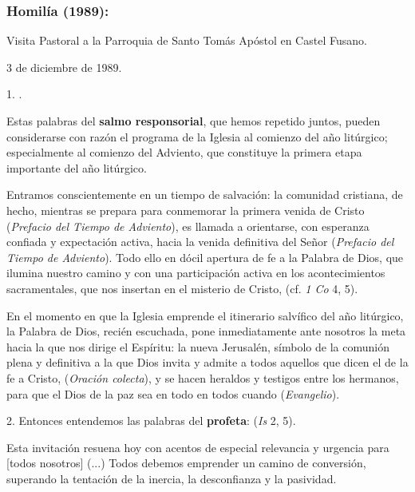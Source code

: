 \subsubsection{Homilía (1989): } Visita Pastoral a la Parroquia de Santo Tomás Apóstol en Castel Fusano.

3 de diciembre de 1989.

\begin{body}
	1. .
	
	Estas palabras del \textbf{salmo responsorial}, que hemos repetido juntos, pueden considerarse con razón el programa de la Iglesia al comienzo del año litúrgico; especialmente al comienzo del Adviento, que constituye la primera etapa importante del año litúrgico.
	
	Entramos conscientemente en un tiempo  de salvación: la comunidad cristiana, de hecho, mientras se prepara para conmemorar la primera venida de Cristo  (\emph{Prefacio del Tiempo de Adviento}), es llamada a orientarse, con esperanza confiada y expectación activa, hacia la venida definitiva del Señor  (\emph{Prefacio del Tiempo de Adviento}). Todo ello en dócil apertura de fe a la Palabra de Dios, que ilumina nuestro camino y con una participación activa en los acontecimientos sacramentales, que nos insertan en el misterio de Cristo,  (cf. \emph{1 Co} 4, 5).
	
	En el momento en que la Iglesia emprende el itinerario salvífico del año litúrgico, la Palabra de Dios, recién escuchada, pone inmediatamente ante nosotros la meta hacia la que nos dirige el Espíritu: la nueva Jerusalén, símbolo de la comunión plena y definitiva a la que Dios invita y admite a todos aquellos que dicen el  de la fe a Cristo,  (\emph{Oración colecta}), y se hacen heraldos y testigos entre los hermanos, para que el Dios de la paz sea en todo en todos cuando  (\emph{Evangelio}).
	
	2. Entonces entendemos las palabras del \textbf{profeta}:  (\emph{Is} 2, 5).
	
	Esta invitación resuena hoy con acentos de especial relevancia y urgencia para {[}todos nosotros{]} (...) Todos debemos emprender un camino de conversión, superando la tentación de la inercia, la desconfianza y la pasividad.
	

\end{body}
